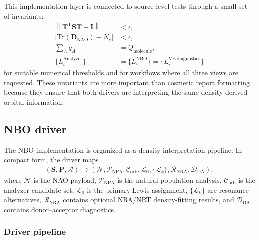 \documentclass[11pt]{article}
\newcommand{\nao}{\mathrm{NAO}}
\newcommand{\dens}{\mathbf{D}}
\begin{document}
This implementation layer is connected to source-level tests through a small set of invariants:
\begin{equation}
\begin{aligned}
	\left\|\mathbf{T}^{\mathrm{T}}\mathbf{S}\mathbf{T}-\mathbf{I}\right\| &< \epsilon, \\
	\left|\mathrm{Tr}(\dens_{\nao})-N_e\right| &< \epsilon, \\
	\sum_A q_A &= Q_{\mathrm{molecule}}, \\
	\{L_i^{\mathrm{Analyzer}}\} &= \{L_i^{\mathrm{NBO}}\} = \{L_i^{\mathrm{VB\ diagnostics}}\}
\end{aligned}
\end{equation}
for suitable numerical thresholds and for workflows where all three views are requested.  These invariants are more important than cosmetic report formatting because they ensure that both drivers are interpreting the same density-derived orbital information.

\subsection{NBO driver}

The NBO implementation is organized as a density-interpretation pipeline.  In compact form, the driver maps
\begin{equation}
\begin{aligned}
	\left(\mathbf{S},\mathbf{P},\mathcal{A}\right)
	\longrightarrow
	\left(\mathcal{N},\mathcal{P}_{\mathrm{NPA}},\mathcal{C}_{\mathrm{orb}},
	\mathcal{L}_0,\{\mathcal{L}_k\},\mathcal{R}_{\mathrm{NRA}},\mathcal{D}_{\mathrm{DA}}\right),
\end{aligned}
\end{equation}
where $\mathcal{N}$ is the NAO payload, $\mathcal{P}_{\mathrm{NPA}}$ is the natural population analysis, $\mathcal{C}_{\mathrm{orb}}$ is the analyzer candidate set, $\mathcal{L}_0$ is the primary Lewis assignment, $\{\mathcal{L}_k\}$ are resonance alternatives, $\mathcal{R}_{\mathrm{NRA}}$ contains optional NRA/NRT density-fitting results, and $\mathcal{D}_{\mathrm{DA}}$ contains donor--acceptor diagnostics.

\subsubsection*{Driver pipeline}
\end{document}
